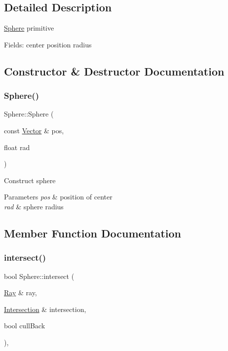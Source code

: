 \subsection{Detailed Description}
\mbox{\hyperlink{class_sphere}{Sphere}} primitive

Fields\+: center position radius 

\subsection{Constructor \& Destructor Documentation}
\mbox{\label{class_sphere_acdc6a785051367320ea2fbbb66769b1a}} 
\subsubsection{\texorpdfstring{Sphere()}{Sphere()}}
{\footnotesize\ttfamily Sphere\+::\+Sphere (\begin{DoxyParamCaption}\item[{const \mbox{\hyperlink{struct_vector}{Vector}} \&}]{pos,  }\item[{float}]{rad }\end{DoxyParamCaption})\hspace{0.3cm}{\ttfamily [inline]}}

Construct sphere 
\begin{DoxyParams}{Parameters}
{\em pos} & position of center \\
\hline
{\em rad} & sphere radius \\
\hline
\end{DoxyParams}


\subsection{Member Function Documentation}
\mbox{\label{class_sphere_ab4700cd65d2bba22863d0bee673e8bf3}} 
\subsubsection{\texorpdfstring{intersect()}{intersect()}\hspace{0.1cm}{\footnotesize\ttfamily [1/2]}}
{\footnotesize\ttfamily bool Sphere\+::intersect (\begin{DoxyParamCaption}\item[{\mbox{\hyperlink{class_ray}{Ray}} \&}]{ray,  }\item[{\mbox{\hyperlink{class_intersection}{Intersection}} \&}]{intersection,  }\item[{bool}]{cull\+Back }\end{DoxyParamCaption})\hspace{0.3cm}{\ttfamily [inline]}, {\ttfamily [virtual]}}


